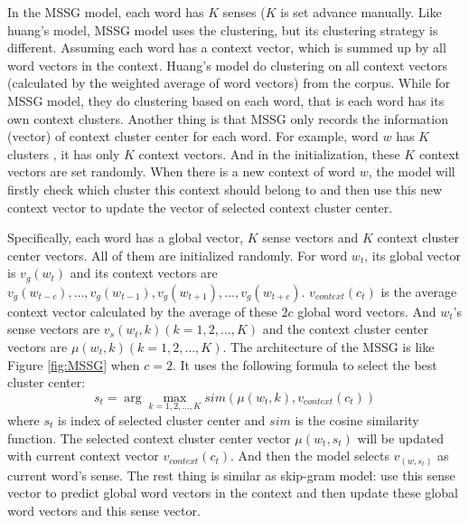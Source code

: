 In the MSSG model, each word has $K$ senses ($K$ is set advance manually. Like huang's model, MSSG model uses the clustering, but its clustering strategy is different. Assuming each word has a context vector, which is summed up by all word vectors in the context. Huang's model do clustering on all context vectors (calculated by the weighted average of word vectors) from the corpus. While for MSSG model, they do clustering based on each word, that is each word has its own context clusters. Another thing is that MSSG only records the information (vector) of context cluster center for each word. For example, word $w$ has $K$ clusters , it has only $K$ context vectors. And in the initialization, these $K$ context vectors are set randomly. When there is a new context of word $w$, the model will firstly check which cluster this context should belong to and then use this new context vector to update the vector of selected context cluster center. 

Specifically, each word has a global vector, $K$ sense vectors and $K$ context cluster center vectors. All of them are initialized randomly. For word $w_t$, its global vector is $v_g(w_t)$ and its context vectors are $v_g(w_{t-c}),\ldots,v_g(w_{t-1}),v_g(w_{t+1}),\ldots,v_g(w_{t+c})$. $v_{context}(c_t)$ is the average context vector calculated by the average of these $2c$ global word vectors. And $w_t$'s sense vectors are $v_s(w_t,k) (k=1,2,\ldots,K)$ and the context cluster center vectors are $\mu(w_t,k) (k=1,2,\ldots,K)$. The architecture of the MSSG is like Figure \ref{fig:MSSG} when $c=2$. It uses the following formula to select the best cluster center:
$$s_t=\arg\max_{k=1,2,\ldots,K} sim(\mu(w_t,k),v_{context}(c_t)) $$
where $s_t$ is index of selected cluster center and $sim$ is the cosine similarity function. The selected context cluster center vector $\mu(w_t,s_t)$ will be updated with current context vector $v_{context}(c_t)$. And then the model selects $v_(w,s_t)$ as current word's sense. The rest thing is similar as skip-gram model: use this sense vector to predict global word vectors in the context and then update these global word vectors and this sense vector.

